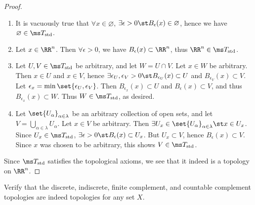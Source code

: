 \begin{proof}~
  \begin{enumerate}[label=\arabic*.]
    \item It is vacuously true that $\forall x \in \varnothing$, $\exists
      \epsilon > 0 \st B_{\epsilon}(x) \in \varnothing$, hence we have
      $\varnothing \in \ms T_{\rm std}$.
    \item Let $x \in \RR^n$. Then $\forall \epsilon > 0$, we have
      $B_{\epsilon}(x) \subset \RR^n$, thus $\RR^n \in \ms T_{\rm std}$.
    \item Let $U,V \in \ms T_{\rm std}$ be arbitrary, and let $W = U \cap V$.
      Let $x \in W$ be arbitrary. Then $x \in U$ and $x \in V$, hence $\exists
      \epsilon_U, \epsilon_V > 0 \st B_{\epsilon_U}(x) \subset U$ and
      $B_{\epsilon_V}(x) \subset V$. Let $\epsilon_x = \min\set{\epsilon_U,
        \epsilon_V}$. Then $B_{\epsilon_x}(x) \subset U$ and $B_{\epsilon}(x)
      \subset V$, and thus $B_{\epsilon_x}(x) \subset W$. Thus $W \in \ms T_{\rm
      std}$, as desired.
    \item Let $\set{U_\alpha}_{\alpha \in \lambda}$ be an arbitrary collection
      of open sets, and let $V = \bigcup_{\alpha \in \lambda} U_\alpha$. Let $x
      \in V$ be arbitrary. Then $\exists U_{x} \in \set{U_\alpha}_{\alpha \in
        \lambda} \st x \in U_x$. Since $U_x \in \ms T_{\rm std}$, $\exists
      \epsilon > 0 \st B_{\epsilon}(x) \subset U_x$. But $U_x \subset V$, hence
      $B_\epsilon(x) \subset V$. Since $x$ was chosen to be arbitrary, this
      shows $V \in \ms T_{\rm std}$.
  \end{enumerate}
  Since $\ms T_{\rm std}$ satisfies the topological axioms, we see that it
  indeed is a topology on $\RR^n$.
\end{proof}
\begin{problem}[3.5]
  Verify that the discrete, indiscrete, finite complement, and countable
  complement topologies are indeed topologies for any set $X$.
\end{problem}
